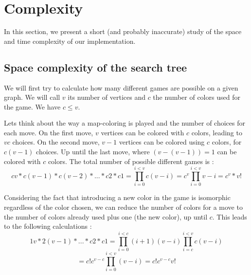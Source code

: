\section{Complexity}

In this section, we present a short (and probably inaccurate) study of the space and time complexity of our implementation.

\subsection{Space complexity of the search tree}

We will first try to calculate how many different games are possible on a given graph. We will call $v$ its number of vertices and $c$ the number of colors used for the game. We have $c\leq v$.

Lets think about the way a map-coloring is played and the number of choices for each move. On the first move, $v$ vertices can be colored with $c$ colors, leading to $vc$ choices. On the second move, $v-1$ vertices can be colored using $c$ colors, for $c(v-1)$ choices. Up until the last move, where $(v-(v-1))=1$ can be colored with $c$ colors. The total number of possible different games is :
\[
cv*c(v-1)*c(v-2)*...*c2*c1 =
\prod_{i=0}^{i<v}c(v-i) =
c^v \prod_{i=0}^{i<v}v-i = c^v*v!
\]

Considering the fact that introducing a new color in the game is isomorphic regardless of the color chosen, we can reduce the number of colors for a move to the number of colors already used plus one (the new color), up until $c$. This leads to the following calculations :
\[
1v*2(v-1)*...*c2*c1 = \prod_{i=0}^{i<c} (i+1)(v-i) \prod_{i=c}^{i<v} c(v-i)
\]\[
= c!c^{v-c} \prod_{i=0}^{i<v}(v-i) = c!c^{v-c}v!
\]